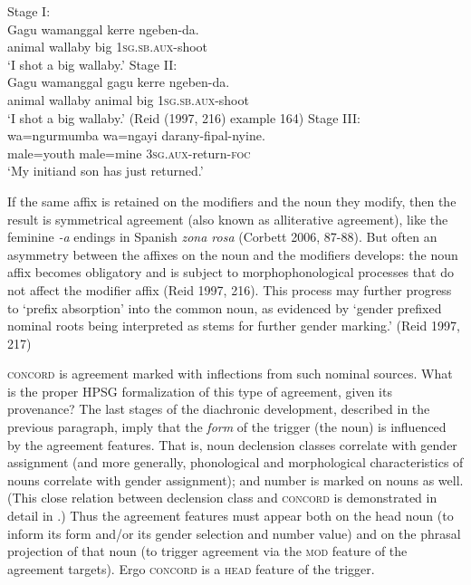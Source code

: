 \documentclass[output=paper]{langsci/langscibook}
\begin{document}
\begin{exe}
\ex
\begin{xlist}
\ex \label{wallaby1} Stage I: \\
\gll 	Gagu	   wamanggal	  kerre    ngeben-da. \\
	     animal	wallaby	      big	      1\textsc{sg.sb.aux}-shoot \\
\glt `I shot a big wallaby.’	
\ex \label{wallaby2} Stage II: \\
\gll 	Gagu	   wamanggal	   gagu	kerre	    ngeben-da. \\
	animal	wallaby	  animal     	big	1\textsc{sg.sb.aux}-shoot\\
\glt ‘I shot a big wallaby.’ (Reid (1997, 216) example 164)
\ex \label{wallaby3} Stage III: \\
\gll 	wa=ngurmumba	wa=ngayi	darany-fipal-nyine. \\
	male=youth		male=mine	\textsc{3sg.aux}-return-\textsc{foc} \\
\glt 	‘My initiand son has just returned.’ 
\end{xlist}
\end{exe}

\noindent
If the same affix is retained on the modifiers and the noun they modify, then the result is symmetrical agreement (also known as alliterative agreement), like the feminine \textit{-a} endings in Spanish \textit{zona rosa} (Corbett 2006, 87-88).  But often an asymmetry between the affixes on the  noun and the modifiers develops: the noun affix becomes obligatory and is subject to morphophonological processes that do not affect the modifier affix (Reid 1997, 216).    This process may further progress to ‘prefix absorption’ into the common noun, as evidenced by ‘gender prefixed nominal roots being interpreted as stems for further gender marking.’ (Reid 1997, 217)  


\textsc{concord} is agreement marked with inflections from such nominal sources.  What is the proper HPSG formalization of this type of agreement, given its provenance?   The last stages of the diachronic development, described in the previous paragraph, imply that the \textit{form} of the trigger (the noun) is influenced by the agreement features.  That is, noun declension classes correlate with gender assignment (and more generally, phonological and morphological characteristics of nouns correlate with gender assignment); and number is marked on nouns as well.  (This close relation between declension class and \textsc{concord} is demonstrated in detail in \citet[ch. 2]{Wechsler+Zlatic:2003}.) Thus the agreement features must appear both on the head noun (to inform its form and/or its gender selection and number value) and on the phrasal projection of that noun (to trigger agreement via the \textsc{mod} feature of the agreement targets).  Ergo \textsc{concord} is a \textsc{head} feature of the trigger.  
\end{document}
